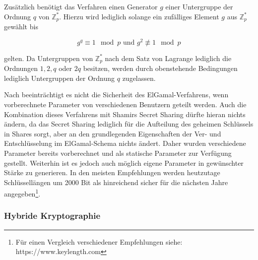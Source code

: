 Zusätzlich benötigt das Verfahren einen Generator \(g\) einer Untergruppe der Ordnung \(q\) von \(\mathbb{Z}_p^*\). Hierzu wird lediglich solange ein zufälliges Element \(g\) aus \(\mathbb{Z}_p^*\) gewählt bis 

\[g^q \equiv 1 \mod p \text{ und } g^2 \not\equiv 1 \mod p\] 

gelten. Da Untergruppen von \(\mathbb{Z}_p^*\) nach dem Satz von Lagrange lediglich die Ordnungen \(1, 2, q\) oder \(2q\) besitzen, werden durch obenstehende Bedingungen lediglich Untergruppen der Ordnung \(q\) zugelassen.

Nach \cite{katz2014} beeinträchtigt es nicht die Sicherheit des ElGamal-Verfahrens, wenn vorberechnete Parameter von verschiedenen Benutzern geteilt werden. Auch die Kombination dieses Verfahrens mit Shamirs Secret Sharing dürfte hieran nichts ändern, da das Secret Sharing lediglich für die Aufteilung des geheimen Schlüssels in Shares sorgt, aber an den grundlegenden Eigenschaften der Ver- und Entschlüsselung im ElGamal-Schema nichts ändert. Daher wurden verschiedene Parameter bereits vorberechnet und als statische Parameter zur Verfügung gestellt. Weiterhin ist es jedoch auch möglich eigene Parameter in gewünschter Stärke zu generieren. In den meisten Empfehlungen werden heutzutage Schlüssellängen um 2000 Bit als hinreichend sicher für die nächsten Jahre angegeben\footnote{
  Für einen Vergleich verschiedener Empfehlungen siehe: https://www.keylength.com
}.

\subsubsection{Hybride Kryptographie}

\label{sec_impl_threshold_hybrid}
  
%  
%  


